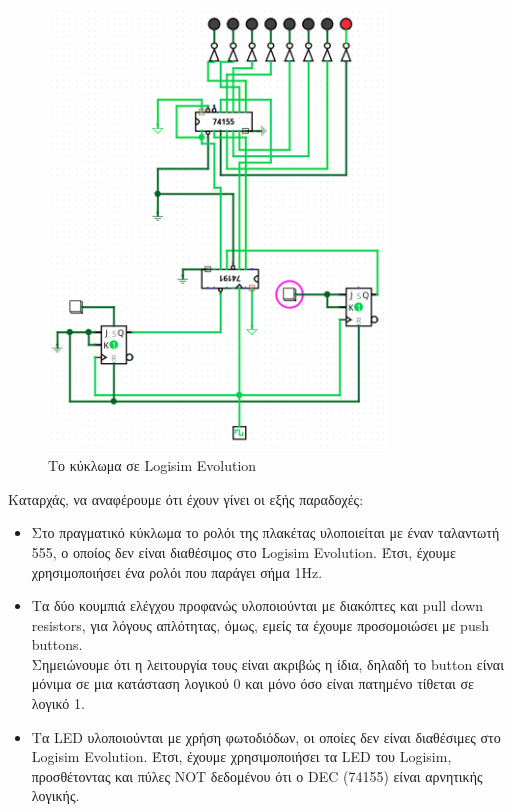 \documentclass[12pt]{article}
\begin{document}
\begin{figure}[H]
    \centering
    \includegraphics[width=0.8\textwidth]{figures/circuit.png}
    \caption{Το κύκλωμα σε Logisim Evolution}
    \label{fig:board}
\end{figure}

Καταρχάς, να αναφέρουμε ότι έχουν γίνει οι εξής παραδοχές:
\begin{itemize}
    \item Στο πραγματικό κύκλωμα το ρολόι της πλακέτας υλοποιείται με έναν ταλαντωτή 555, ο οποίος δεν είναι διαθέσιμος στο Logisim Evolution. 
          Έτσι, έχουμε χρησιμοποιήσει ένα ρολόι που παράγει σήμα 1Hz.
    \item Τα δύο κουμπιά ελέγχου προφανώς υλοποιούνται με διακόπτες και pull down resistors, για λόγους απλότητας, όμως, εμείς τα έχουμε προσομοιώσει με push buttons. \\
          Σημειώνουμε ότι η λειτουργία τους είναι ακριβώς η ίδια, δηλαδή το button είναι μόνιμα σε μια κατάσταση λογικού 0 και μόνο όσο είναι πατημένο τίθεται σε λογικό 1.
    \item Τα LED υλοποιούνται με χρήση φωτοδιόδων, οι οποίες δεν είναι διαθέσιμες στο Logisim Evolution. 
          Έτσι, έχουμε χρησιμοποιήσει τα LED του Logisim, προσθέτοντας και πύλες NOT δεδομένου ότι ο DEC (74155) είναι αρνητικής λογικής.
\end{itemize}
\end{document}
